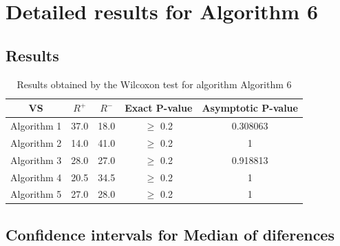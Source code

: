 \documentclass[a4paper,10pt]{article}
\begin{document}
 \clearpage 


\section{Detailed results for Algorithm 6}


\subsection{Results}

\begin{table}[!htp]
\centering\small
\begin{tabular}{
|c|c|c|c|c|}
\hline
 VS & $R^{+}$ & $R^{-}$ & Exact P-value & Asymptotic P-value \\ \hline 
Algorithm 1 & 37.0 & 18.0 & $\geq$ 0.2 & 0.308063\\ \hline 
Algorithm 2 & 14.0 & 41.0 & $\geq$ 0.2 & 1\\ \hline 
Algorithm 3 & 28.0 & 27.0 & $\geq$ 0.2 & 0.918813\\ \hline 
Algorithm 4 & 20.5 & 34.5 & $\geq$ 0.2 & 1\\ \hline 
Algorithm 5 & 27.0 & 28.0 & $\geq$ 0.2 & 1\\ \hline 

\end{tabular}
\caption{Results obtained by the Wilcoxon test for algorithm Algorithm 6}
\end{table}

\subsection{Confidence intervals for Median of diferences}
\end{document}
